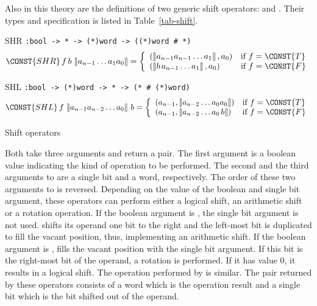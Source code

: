 Also in this theory are the definitions of two generic shift operators:
 and . Their types and specification is listed
in Table~\ref{tab-shift}.
\begin{table}
\begin{center}
\begin{constants}
\item[SHR]\verb":bool -> * -> (*)word -> ((*)word # *)"\newline
\[
\CONST{SHR}\, f\,b\,\nword{a_{n-1}\ldots a_1 a_0} = 
  \left\{ \begin{array}{ll}
        (\nword{a_{n-1} a_{n-1}\ldots a_1}, a_0) & \mbox{if $f = \CONST{T}$} \\
        (\nword{b\,a_{n-1}\ldots a_1}, a_0) & \mbox{if $f = \CONST{F}$} \\
        \end{array}
        \right.
\]
\item[SHL]\verb":bool -> (*)word -> * -> (* # (*)word)"\newline
\[
\CONST{SHL}\, f\,\nword{a_{n-1}a_{n-2}\ldots a_0} \,b = 
  \left\{ \begin{array}{ll}
        (a_{n-1}, \nword{a_{n-2}\ldots a_0 a_0}) & \mbox{if $f = \CONST{T}$} \\
        (a_{n-1}, \nword{a_{n-2}\ldots a_0\,b}) & \mbox{if $f = \CONST{F}$} \\
        \end{array}
        \right.
\]
\end{constants}
\end{center}
\caption{Shift operators\label{tab-shift}}
\end{table}
Both take three arguments and return a
pair. The first argument is a boolean value indicating the kind of
operation to be performed. The second and the third arguments to
 are a single bit and a word, respectively. The order of
these two arguments to  is reversed. Depending on the value
of the boolean and single bit argument, these operators can perform
either a logical shift, an arithmetic shift or a rotation operation.
If the boolean argument is , the single bit argument is not
used.  shifts its operand one bit to the right and the
left-most bit is duplicated to fill the vacant position, thus,
implementing an arithmetic shift. If the boolean argument is
,  fills the vacant position with the single bit
argument. If this bit is the right-most bit of the operand, a
rotation is performed. If it has value 0, it results in a logical
shift. The operation performed by  is similar. The pair
returned by these operators consists of a word which 
is the operation result and a single bit which is the bit shifted out
of the operand.


